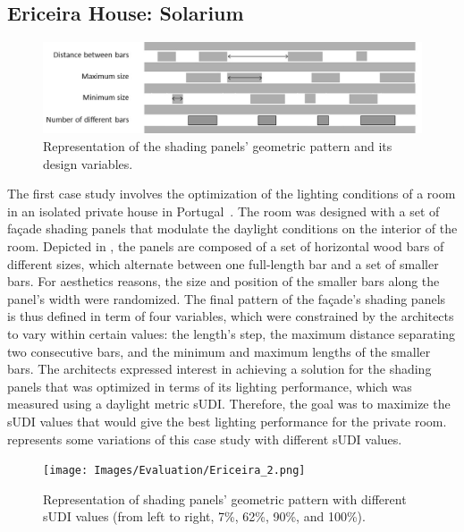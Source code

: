 \subsection{Ericeira House: Solarium}

\begin{figure}
	\centering
	\includegraphics[width=\textwidth]{Images/Evaluation/Ericeira_1.jpg}
	\caption{Representation of the shading panels' geometric pattern and its design variables.}
	\label{fig:ericeira_panels_explanation}
\end{figure}

The first case study involves the optimization of the lighting conditions of a room in an isolated private house in Portugal~\cite{Caetano2018,Belem2018optimizeddesign}. The room was designed with a set of façade shading panels that modulate the daylight conditions on the interior of the room. Depicted in , the panels are composed of a set of horizontal wood bars of different sizes, which alternate between one full-length bar and a set of smaller bars. For aesthetics reasons, the size and position of the smaller bars along the panel's width were randomized. The final pattern of the façade's shading panels is thus defined in term of four variables, which were constrained by the architects to vary within certain values: the length’s step, the maximum distance separating two consecutive bars, and the minimum and maximum lengths of the smaller bars. The architects expressed interest in achieving a solution for the shading panels that was optimized in terms of its lighting performance, which was measured using a daylight metric \ac{sUDI}. Therefore, the goal was to maximize the \ac{sUDI} values that would give the best lighting performance for the private room.  represents some variations of this case study with different \ac{sUDI} values.

\begin{figure}
	\centering
	\texttt{[image: Images/Evaluation/Ericeira\_2.png]}
	\caption{Representation of shading panels’ geometric pattern with different sUDI values (from left to right, 7\%, 62\%, 90\%, and 100\%).}
	\label{fig:ericeira_multiple_panels}
\end{figure}

